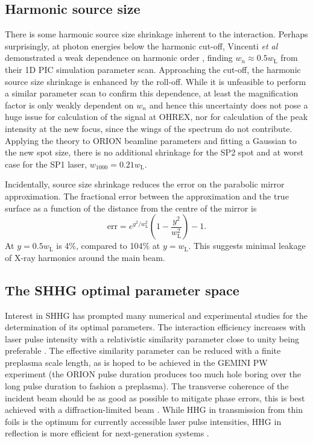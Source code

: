 \subsection{Harmonic source size}
There is some harmonic source size shrinkage inherent to the interaction. Perhaps surprisingly, at photon energies below the harmonic cut-off, Vincenti \textit{et al} demonstrated a weak dependence on harmonic order \cite{vincentiOpticalPropertiesRelativistic2014}, finding $w_n \approx 0.5 w_\mathrm{L}$ from their 1D PIC simulation parameter scan. Approaching the cut-off, the harmonic source size shrinkage is enhanced by the roll-off. While it is unfeasible to perform a similar parameter scan to confirm this dependence, at least the magnification factor is only weakly dependent on $w_n$ and hence this uncertainty does not pose a huge issue for calculation of the signal at OHREX, nor for calculation of the peak intensity at the new focus, since the wings of the spectrum do not contribute. Applying the theory to ORION beamline parameters and fitting a Gaussian to the new spot size, there is no additional shrinkage for the SP2 spot and at worst case for the SP1 laser, $w_{1000} = 0.21w_\mathrm{L}$.

Incidentally, source size shrinkage reduces the error on the parabolic mirror approximation. The fractional error between the approximation and the true surface as a function of the distance from the centre of the mirror is
\begin{equation}
	\mathrm{err} = e^{y^2/w^2_\mathrm{L}}\left(1-\frac{y^2}{w^2_\mathrm{L}}\right)-1.
\end{equation}
At $y=0.5 w_\mathrm{L}$ is 4\%, compared to 104\% at $y= w_\mathrm{L}$. This suggests minimal leakage of X-ray harmonics around the main beam.

\subsection{The SHHG optimal parameter space}
Interest in SHHG has prompted many numerical and experimental studies for the determination of its optimal parameters. The interaction efficiency increases with laser pulse intensity \cite{pukhovRelativisticHighHarmonics2009, edwardsXRayEmissionEffectiveness2020} with a relativistic similarity parameter close to unity being preferable \cite{edwardsXRayEmissionEffectiveness2020, gonoskovUltrarelativisticNanoplasmonicsRoute2011}. The effective similarity parameter can be reduced with a finite preplasma scale length, as is hoped to be achieved in the GEMINI PW experiment (the ORION pulse duration produces too much hole boring over the long pulse duration to fashion a preplasma). The transverse coherence of the incident beam should be as good as possible to mitigate phase errors, this is best achieved with a diffraction-limited beam \cite{dromeyHighHarmonicGeneration2006}. While HHG in transmission from thin foils is the optimum for currently accessible laser pulse intensities, HHG in reflection is more efficient for next-generation systems \cite{edwardsElectronNanobunchWidthDominatedSpectralPower2020}. 

